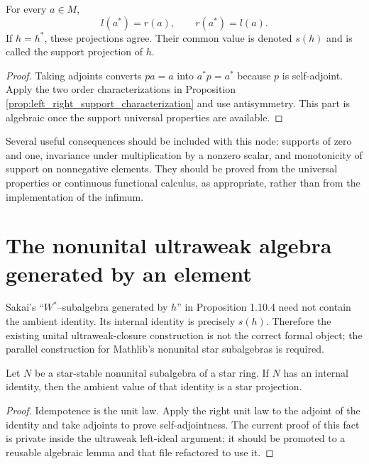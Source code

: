 \begin{lemma}
  \label{lem:support_star_compatibility}
  \notready
  For every $a\in M$,
  \[
    l(a^{*})=r(a),\qquad r(a^{*})=l(a).
  \]
  If $h=h^{*}$, these projections agree.  Their common value is denoted $s(h)$ and is called the
  support projection of $h$.
\end{lemma}

\begin{proof}
  \notready
  Taking adjoints converts $pa=a$ into $a^{*}p=a^{*}$ because $p$ is self-adjoint.  Apply the two
  order characterizations in Proposition \ref{prop:left_right_support_characterization} and use
  antisymmetry.  This part is algebraic once the support universal properties are available.
\end{proof}

Several useful consequences should be included with this node: supports of zero and one,
invariance under multiplication by a nonzero scalar, and monotonicity of support on nonnegative
elements.  They should be proved from the universal properties or continuous functional calculus,
as appropriate, rather than from the implementation of the infimum.

\section{The nonunital ultraweak algebra generated by an element}

Sakai's ``$W^{*}$--subalgebra generated by $h$'' in Proposition 1.10.4 need not contain the
ambient identity.  Its internal identity is precisely $s(h)$.  Therefore the existing unital
ultraweak-closure construction is not the correct formal object; the parallel construction for
Mathlib's nonunital star subalgebras is required.

\begin{lemma}
  \label{lem:internal_unit_is_projection}
  \notready
  Let $N$ be a star-stable nonunital subalgebra of a star ring.  If $N$ has an internal identity,
  then the ambient value of that identity is a star projection.
\end{lemma}

\begin{proof}
  \notready
  Idempotence is the unit law.  Apply the right unit law to the adjoint of the identity and take
  adjoints to prove self-adjointness.  The current proof of this fact is private inside the
  ultraweak left-ideal argument; it should be promoted to a reusable algebraic lemma and that file
  refactored to use it.
\end{proof}

